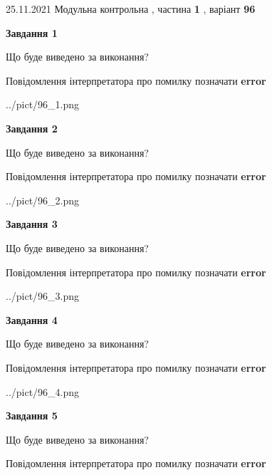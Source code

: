 \documentclass[10pt, ukrainian]{article}
\begin{document}
{25.11.2021 Модульна контрольна , частина \textbf { 1 }, варіант  \No \textbf { 96 }\par}
{
\begin {large}

{\begin {center}\textbf{Завдання 1}\end {center}}\par
Що буде виведено за виконання? \par
Повідомлення інтерпретатора про помилку позначати \textbf{error}

\begin{center}
	{../pict/96_1.png}
\end{center}
\newpage

{\begin {center}\textbf{Завдання 2}\end {center}}\par
Що буде виведено за виконання? \par
Повідомлення інтерпретатора про помилку позначати \textbf{error}

\begin{center}
	{../pict/96_2.png}
\end{center}
\newpage

{\begin {center}\textbf{Завдання 3}\end {center}}\par
Що буде виведено за виконання? \par
Повідомлення інтерпретатора про помилку позначати \textbf{error}

\begin{center}
	{../pict/96_3.png}
\end{center}
\newpage

{\begin {center}\textbf{Завдання 4}\end {center}}\par
Що буде виведено за виконання? \par
Повідомлення інтерпретатора про помилку позначати \textbf{error}

\begin{center}
	{../pict/96_4.png}
\end{center}
\newpage

{\begin {center}\textbf{Завдання 5}\end {center}}\par
Що буде виведено за виконання? \par
Повідомлення інтерпретатора про помилку позначати \textbf{error}


\end{large}}
\end{document}
